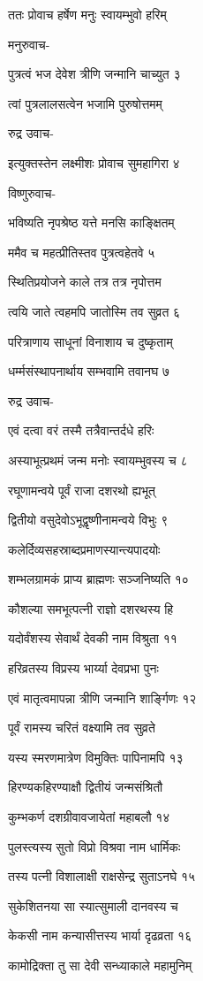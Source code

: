 ततः प्रोवाच हर्षेण मनुः स्वायम्भुवो हरिम्

मनुरुवाच-

पुत्रत्वं भज देवेश त्रीणि जन्मानि चाच्युत ३

त्वां पुत्रलालसत्वेन भजामि पुरुषोत्तमम्

रुद्र उवाच-

इत्युक्तस्तेन लक्ष्मीशः प्रोवाच सुमहागिरा ४

विष्णुरुवाच-

भविष्यति नृपश्रेष्ठ यत्ते मनसि काङ्क्षितम्

ममैव च महत्प्रीतिस्तव पुत्रत्वहेतवे ५

स्थितिप्रयोजने काले तत्र तत्र नृपोत्तम

त्वयि जाते त्वहमपि जातोस्मि तव सुव्रत ६

परित्राणाय साधूनां विनाशाय च दुष्कृताम्

धर्म्मसंस्थापनार्थाय सम्भवामि तवानघ ७

रुद्र उवाच-

एवं दत्वा वरं तस्मै तत्रैवान्तर्दधे हरिः

अस्याभूत्प्रथमं जन्म मनोः स्वायम्भुवस्य च ८

रघूणामन्वये पूर्वं राजा दशरथो ह्यभूत्

द्वितीयो वसुदेवोऽभूद्वृष्णीनामन्वये विभुः ९

कलेर्दिव्यसहस्राब्दप्रमाणस्यान्त्यपादयोः

शम्भलग्रामकं प्राप्य ब्राह्मणः सञ्जनिष्यति १०

कौशल्या समभूत्पत्नी राज्ञो दशरथस्य हि

यदोर्वंशस्य सेवार्थं देवकी नाम विश्रुता ११

हरिव्रतस्य विप्रस्य भार्य्या देवप्रभा पुनः

एवं मातृत्वमापन्ना त्रीणि जन्मानि शार्ङ्गिणः १२

पूर्वं रामस्य चरितं वक्ष्यामि तव सुव्रते

यस्य स्मरणमात्रेण विमुक्तिः पापिनामपि १३

हिरण्यकहिरण्याक्षौ द्वितीयं जन्मसंश्रितौ

कुम्भकर्ण दशग्रीवावजायेतां महाबलौ १४

पुलस्त्यस्य सुतो विप्रो विश्रवा नाम धार्मिकः

तस्य पत्नी विशालाक्षी राक्षसेन्द्र सुताऽनघे १५

सुकेशितनया सा स्यात्सुमाली दानवस्य च

केकसी नाम कन्यासीत्तस्य भार्या दृढव्रता १६

कामोद्रिक्ता तु सा देवी सन्ध्याकाले महामुनिम्

